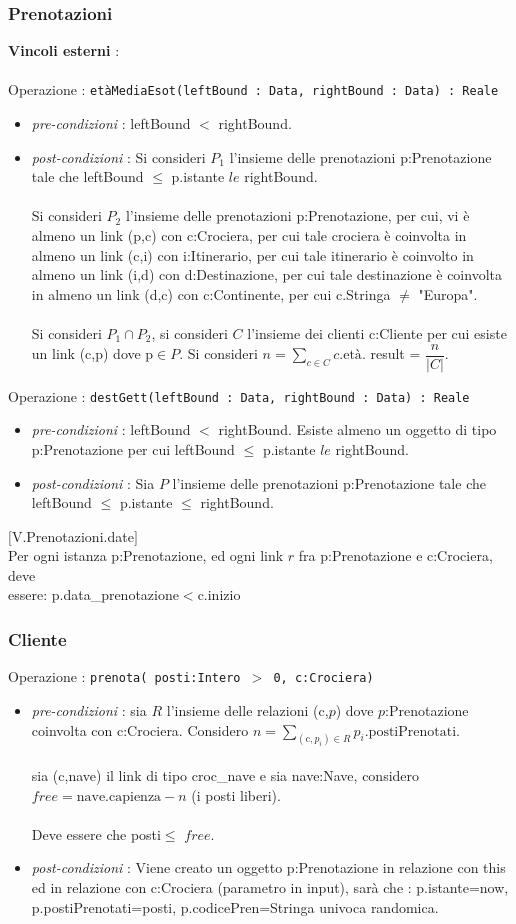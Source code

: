 \documentclass[12pt, letterpaper]{article}
\newcommand{\acc}{\\\hphantom{}\\}
\newcommand{\code}[1]{\colorbox{light-gray}{\texttt{#1}}}
\begin{document}
\subsubsection{Prenotazioni}
\textbf{Vincoli esterni} :\acc
Operazione : \code{etàMediaEsot(leftBound : Data, rightBound : Data) : Reale}\begin{itemize}
    \item \textit{pre-condizioni} : leftBound $<$ rightBound.
    \item \textit{post-condizioni} : Si consideri $P_1$ l'insieme delle prenotazioni p:Prenotazione tale
          che leftBound $\le$ p.istante $le$ rightBound.\acc
          Si consideri $P_2$ l'insieme delle prenotazioni p:Prenotazione, per cui, vi è almeno un link (p,c) con c:Crociera, per cui
          tale crociera è coinvolta in almeno un link (c,i) con i:Itinerario, per cui tale itinerario è coinvolto in almeno un
          link (i,d) con d:Destinazione, per cui tale destinazione è coinvolta in almeno un link (d,c) con c:Continente, per cui
          c.Stringa $\ne$ "Europa".\acc
          Si consideri $P_1\cap P_2$, si consideri $C$ l'insieme dei clienti c:Cliente per cui esiste un link (c,p) dove
          p$\in P$. Si consideri $n=\displaystyle \sum_{c\in C}c.\text{età}$.
          result = $\dfrac{n}{|C|}$.
\end{itemize}
Operazione : \code{destGett(leftBound : Data, rightBound : Data) : Reale}\begin{itemize}
    \item \textit{pre-condizioni} : leftBound $<$ rightBound. Esiste almeno un oggetto di tipo p:Prenotazione
          per cui leftBound $\le$ p.istante $le$ rightBound.
    \item \textit{post-condizioni} : Sia $P$ l'insieme delle prenotazioni p:Prenotazione tale
          che leftBound $\le$ p.istante $\le$ rightBound.
\end{itemize}
$[$V.Prenotazioni.date$]$\\
\hphantom{ident} Per ogni istanza p:Prenotazione, ed ogni link $r$ fra p:Prenotazione e c:Crociera, deve\\
\hphantom{ident} essere:
p.data\_prenotazione$<$c.inizio
\subsubsection{Cliente}
Operazione : \code{prenota( posti:Intero $>$ 0, c:Crociera)}\begin{itemize}
    \item \textit{pre-condizioni} : sia $R$ l'insieme delle relazioni (c,$p$) dove
          $p$:Prenotazione coinvolta con c:Crociera. Considero $n=\displaystyle\sum_{(\text{c},p_i)\in R}p_i.\text{postiPrenotati}$.\acc
          sia (c,nave) il link di tipo croc\_nave e sia nave:Nave, considero $free=\text{nave.capienza}-n$ (i posti liberi). \acc
          Deve essere che posti$\le$ $free$.
    \item \textit{post-condizioni} : Viene creato un oggetto p:Prenotazione in relazione con this ed in relazione con
          c:Crociera (parametro in input), sarà che : p.istante=now, p.postiPrenotati=posti, p.codicePren=Stringa univoca randomica.
\end{itemize}
\end{document}
